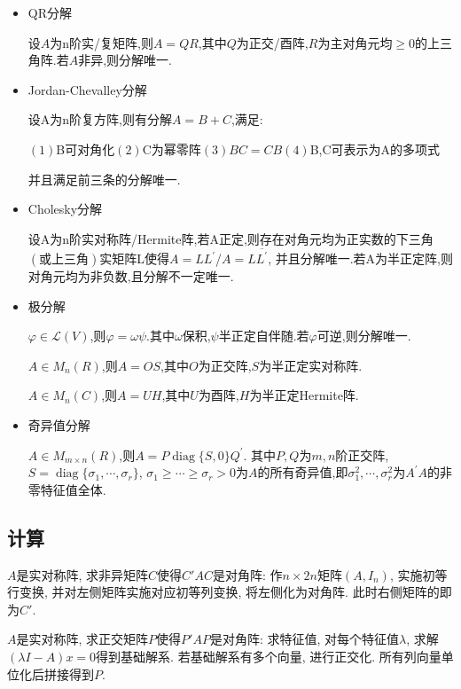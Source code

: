 \documentclass[UTF8]{ctexart}
\begin{document}
\begin{itemize}

\item QR分解\par 
设$A$为n阶实/复矩阵,则$A=QR$,其中$Q$为正交/酉阵,$R$为主对角元均$\geq 0$的上三角阵.若$A$非异,则分解唯一.

\item Jordan-Chevalley分解\par 
设A为n阶复方阵,则有分解$A=B+C$,满足:\par 
$(1)$B可对角化\qquad $(2)$C为幂零阵\qquad $(3)$$BC=CB$\qquad $(4)$B,C可表示为A的多项式\par 
并且满足前三条的分解唯一.

\item Cholesky分解\par 
设A为n阶实对称阵/Hermite阵,若A正定,则存在对角元均为正实数的下三角$(\text{或上三角})$实矩阵L使得$A=LL^{\prime}$/$A=L\overline{L^{\prime}}$,
并且分解唯一.若A为半正定阵,则对角元均为非负数,且分解不一定唯一.

\item 极分解\par 
$\varphi \in \mathcal{L}(V)$,则$\varphi = \omega\psi$.其中$\omega$保积,$\psi$半正定自伴随.若$\varphi $可逆,则分解唯一. \par 
$A\in M_n(R)$,则$A=OS$,其中$O$为正交阵,$S$为半正定实对称阵.\par 
$A\in M_n(C)$,则$A=UH$,其中$U$为酉阵,$H$为半正定Hermite阵.

\item 奇异值分解\par 
$A\in M_{m\times n}(R)$,则$A=P \operatorname{diag}\{S,0\}Q^{\prime}$.
其中$P,Q$为$m,n$阶正交阵,$S=\operatorname{diag}\{\sigma_1,\cdots ,\sigma_r\}$,
$\sigma_1\geq \cdots \geq \sigma_r>0$为$A$的所有奇异值,即$\sigma_1^2,\cdots,\sigma_r^2$为$A^{\prime}A$的非零特征值全体.

\end{itemize}


\subsection{计算}

$A$是实对称阵, 求非异矩阵$C$使得$C'AC$是对角阵: 
作$n\times 2n$矩阵$(A, I_n)$, 实施初等行变换, 并对左侧矩阵实施对应初等列变换,
将左侧化为对角阵. 此时右侧矩阵的即为$C'$.


$A$是实对称阵, 求正交矩阵$P$使得$P'AP$是对角阵: 
求特征值, 对每个特征值$\lambda$, 求解$(\lambda I-A)x=0$得到基础解系.
若基础解系有多个向量, 进行正交化.
所有列向量单位化后拼接得到$P$.
\end{document}

